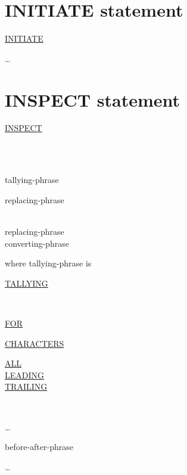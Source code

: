 \documentclass[a4paper,oneside,svgnames]{scrbook}
\makeatletter
\newcommand{\key}[1]{\underline{#1}}
\newcommand{\pending}[1]{%
  \textcolor{gray!75}{#1}}
\newenvironment{0-1}{$\left[ \begin{tabular}{@{}l@{}}}{\end{tabular} \right]$}
\newenvironment{1=}{$\left\{ \begin{tabular}{@{}l@{}}}{\end{tabular} \right\}$}
\makeatother
\begin{document}
\section{INITIATE statement}
\pending{
  \key{INITIATE}
  \begin{1=}
    \reportname
  \end{1=} \ldots
}

\section{INSPECT statement}

\key{INSPECT}
\begin{1=}
  \identifier \\
  \literal \\
  \functionname
\end{1=}
\begin{1=}
  tallying-phrase
  \begin{0-1}
    replacing-phrase
  \end{0-1} \\

  replacing-phrase \\
  converting-phrase
\end{1=}

where tallying-phrase is

\key{TALLYING}
\begin{1=}
  \begin{1=}
    \begin{1=}
      \identifier \\
      \literal
    \end{1=}
    \key{FOR}
    \begin{1=}
      \key{CHARACTERS} \\

      \begin{1=}
        \key{ALL} \\
        \key{LEADING} \\
        \key{TRAILING}
      \end{1=}
      \begin{1=}
        \identifier \\
        \literal
      \end{1=}
    \end{1=}
  \end{1=}\ldots
  \begin{0-1}
    before-after-phrase
  \end{0-1}
\end{1=} \ldots
\end{document}
